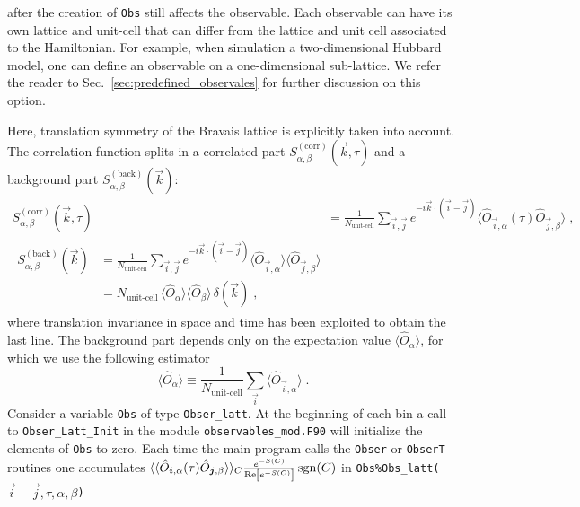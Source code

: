 \begin{table}[h!]
\begin{center}
{after the creation of \texttt{Obs} still affects the observable.    Each  observable  can have its  own lattice  and  unit-cell  that  can  differ  from  the lattice  and  unit  cell  associated to the Hamiltonian. For  example,    when  simulation a  two-dimensional  Hubbard model,  one  can  define an observable on a one-dimensional sub-lattice.  We  refer  the   reader  to Sec.~\ref{sec:predefined_observales}     for  further   discussion on this    option.   }
   \label{table:Obser_latt}
\end{center}
\end{table}
%
Here,  translation symmetry of the Bravais lattice is explicitly taken into account. 
The correlation function splits in a correlated part $S_{\alpha,\beta}^{\mathrm{(corr)}}(\vec{k},\tau)$ and a background part $S_{\alpha,\beta}^{\mathrm{(back)}}(\vec{k})$:
\begin{align}
S_{\alpha,\beta}^{\mathrm{(corr)}}(\vec{k},\tau)
&=
\frac{1}{N_{\text{unit-cell}}} \sum_{\vec{i},\vec{j}}  e^{- i\vec{k} \cdot \left( \vec{i}-\vec{j}\right) }  \langle \hat{O}_{\vec{i},\alpha} (\tau) \hat{O}_{\vec{j},\beta} \rangle \label{eqn:s_corr} \;,\\
\begin{split}
S_{\alpha,\beta}^{\mathrm{(back)}}(\vec{k})
&=
\frac{1}{N_{\text{unit-cell}}} \sum_{\vec{i},\vec{j}}  e^{- i\vec{k} \cdot \left( \vec{i}-\vec{j}\right) }  \langle \hat{O}_{\vec{i},\alpha} \rangle \langle \hat{O}_{\vec{j},\beta} \rangle\\
&=
N_{\text{unit-cell}}\, \langle \hat{O}_{\alpha} \rangle \langle \hat{O}_{\beta} \rangle \, \delta(\vec{k}) \label{eqn:s_back}\;,
\end{split}
\end{align}
where translation invariance in space and time has been exploited to obtain the last line. 
The background part depends only on the expectation value $\langle \hat{O}_{\alpha} \rangle$, for which we use the following estimator 
\begin{equation}\label{eqn:o}
\langle \hat{O}_{\alpha} \rangle \equiv \frac{1}{N_{\text{unit-cell}}} \sum\limits_{\vec{i}} \langle \hat{O}_{\vec{i},\alpha} \rangle\;.
\end{equation}
Consider a variable  \texttt{Obs} of type  \texttt{Obser\_latt}. At the beginning of each bin a call to  \texttt{Obser\_Latt\_Init} in the module \texttt{observables\_mod.F90}  will  initialize  the elements of \texttt{Obs} to zero.    Each time the main program calls the   \texttt{Obser} or  \texttt{ObserT} routines one accumulates $ \langle \langle \hat{O}_{\boldsymbol{i},\alpha} (\tau) \hat{O}_{\boldsymbol{j},\beta} \rangle \rangle_{C} \allowbreak \frac{e^{-S(C)}} {\operatorname{Re} \left[e^{-S(C)} \right]}  \operatorname{sgn}(C) $    in  \texttt{Obs\%Obs\_latt($\vec{i}-\vec{j},\tau,\alpha,\beta$)}   
